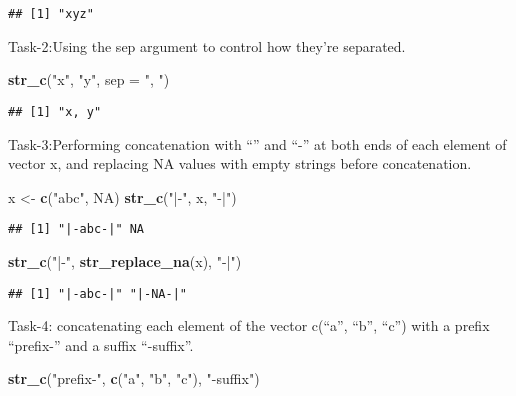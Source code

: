 \documentclass[
]{article}
\newenvironment{Shaded}{\begin{snugshade}}{\end{snugshade}}
\newcommand{\AttributeTok}[1]{\textcolor[rgb]{0.13,0.29,0.53}{#1}}
\newcommand{\ConstantTok}[1]{\textcolor[rgb]{0.56,0.35,0.01}{#1}}
\newcommand{\FunctionTok}[1]{\textcolor[rgb]{0.13,0.29,0.53}{\textbf{#1}}}
\newcommand{\NormalTok}[1]{#1}
\newcommand{\OtherTok}[1]{\textcolor[rgb]{0.56,0.35,0.01}{#1}}
\newcommand{\StringTok}[1]{\textcolor[rgb]{0.31,0.60,0.02}{#1}}
\begin{document}
\begin{verbatim}
## [1] "xyz"
\end{verbatim}

Task-2:Using the sep argument to control how they're separated.

\begin{Shaded}
\begin{Highlighting}[]
\FunctionTok{str\_c}\NormalTok{(}\StringTok{"x"}\NormalTok{, }\StringTok{"y"}\NormalTok{, }\AttributeTok{sep =} \StringTok{", "}\NormalTok{)}
\end{Highlighting}
\end{Shaded}

\begin{verbatim}
## [1] "x, y"
\end{verbatim}

Task-3:Performing concatenation with ``\textbar{}'' and ``-'' at both
ends of each element of vector x, and replacing NA values with empty
strings before concatenation.

\begin{Shaded}
\begin{Highlighting}[]
\NormalTok{x }\OtherTok{\textless{}{-}} \FunctionTok{c}\NormalTok{(}\StringTok{"abc"}\NormalTok{, }\ConstantTok{NA}\NormalTok{)}
\FunctionTok{str\_c}\NormalTok{(}\StringTok{"|{-}"}\NormalTok{, x, }\StringTok{"{-}|"}\NormalTok{)}
\end{Highlighting}
\end{Shaded}

\begin{verbatim}
## [1] "|-abc-|" NA
\end{verbatim}

\begin{Shaded}
\begin{Highlighting}[]
\FunctionTok{str\_c}\NormalTok{(}\StringTok{"|{-}"}\NormalTok{, }\FunctionTok{str\_replace\_na}\NormalTok{(x), }\StringTok{"{-}|"}\NormalTok{)}
\end{Highlighting}
\end{Shaded}

\begin{verbatim}
## [1] "|-abc-|" "|-NA-|"
\end{verbatim}

Task-4: concatenating each element of the vector c(``a'', ``b'', ``c'')
with a prefix ``prefix-'' and a suffix ``-suffix''.

\begin{Shaded}
\begin{Highlighting}[]
\FunctionTok{str\_c}\NormalTok{(}\StringTok{"prefix{-}"}\NormalTok{, }\FunctionTok{c}\NormalTok{(}\StringTok{"a"}\NormalTok{, }\StringTok{"b"}\NormalTok{, }\StringTok{"c"}\NormalTok{), }\StringTok{"{-}suffix"}\NormalTok{)}
\end{Highlighting}
\end{Shaded}
\end{document}
